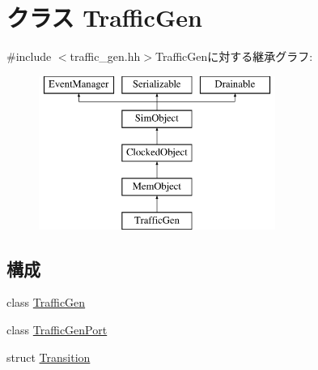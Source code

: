 \hypertarget{classTrafficGen}{
\section{クラス TrafficGen}
\label{classTrafficGen}
}


{\ttfamily \#include $<$traffic\_\-gen.hh$>$}TrafficGenに対する継承グラフ:\begin{figure}[H]
\begin{center}
\leavevmode
\includegraphics[height=5cm]{classTrafficGen}
\end{center}
\end{figure}
\subsection*{構成}
\begin{DoxyCompactItemize}
\item 
class \hyperlink{classTrafficGen_1_1TrafficGen}{TrafficGen}
\item 
class \hyperlink{classTrafficGen_1_1TrafficGenPort}{TrafficGenPort}
\item 
struct \hyperlink{structTrafficGen_1_1Transition}{Transition}
\end{DoxyCompactItemize}

